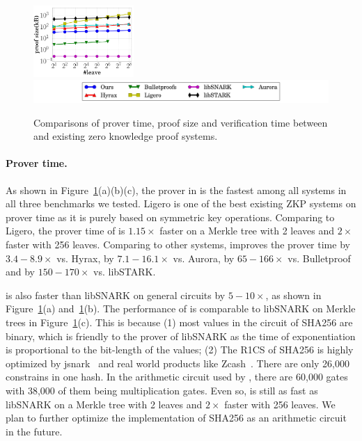 \begin{figure}[t!]
{	%
	\includegraphics[width=1.5in]{fig3.pdf}
}%
\quad
\centering
\includegraphics[width = 5in]{legend.pdf}
\caption{\label{fig:Allcom}Comparisons of prover time, proof size and verification time between \name{} and existing zero knowledge proof systems.}
\end{figure}


\paragraph{Prover time.} As shown in Figure~\ref{fig:Allcom}(a)(b)(c), the prover in \name is the fastest among all systems in all three benchmarks we tested. Ligero is one of the best existing ZKP systems on prover time as it is purely based on symmetric key operations. Comparing to Ligero, the prover time of \name is $1.15\times$ faster on a Merkle tree with 2 leaves and $2\times$ faster with 256 leaves. Comparing to other systems, \name improves the prover time by $3.4-8.9\times$ vs. Hyrax, by $7.1-16.1\times$ vs. Aurora, by $65-166\times$ vs. Bulletproof and by $150-170\times$ vs. libSTARK. 

\name is also faster than libSNARK on general circuits by $5-10\times$, as shown in Figure~\ref{fig:Allcom}(a) and~\ref{fig:Allcom}(b). The performance of \name is comparable to libSNARK on Merkle trees in Figure~\ref{fig:Allcom}(c). This is because (1) most values in the circuit of SHA256 are binary, which is friendly to the prover of libSNARK as the time of exponentiation is proportional to the bit-length of the values; (2) The R1CS of SHA256 is highly optimized by jsnark~\cite{jsnark} and real world products like Zcash~\cite{zerocash}. There are only 26,000 constrains in one hash. In the arithmetic circuit used by \name, there are 60,000 gates with 38,000 of them being multiplication gates. Even so, \name is still as fast as libSNARK on a Merkle tree with 2 leaves and $2\times$ faster with 256 leaves. We plan to further optimize the implementation of SHA256 as an arithmetic circuit in the future.

